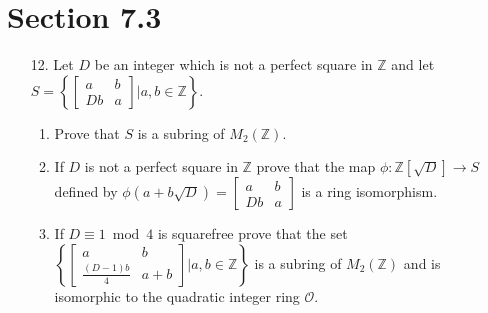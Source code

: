 \documentclass[12pt,leqno]{book}
\theoremstyle{definition}
\newcommand{\Z}{\mathbb{Z}}
\begin{document}
\section*{Section 7.3}
\begin{enumerate}
 \item [12.] Let $D$ be an integer which is not a perfect square in $\Z$ and let $S=\left\{\begin{bmatrix}a&b\\Db&a\end{bmatrix}|a,b\in\Z\right\}$.
  \begin{enumerate}
   \item Prove that $S$ is a subring of $M_2(\Z)$.
   \item If $D$ is not a perfect square in $\Z$ prove that the map $\phi:\Z[\sqrt{D}]\to S$ defined by $\phi(a+b\sqrt{D})=\begin{bmatrix}a&b\\Db&a\end{bmatrix}$ is a ring isomorphism.
   \item If $D\equiv1\bmod{4}$ is squarefree prove that the set $\left\{\begin{bmatrix}a&b\\\frac{(D-1)b}{4}&a+b\end{bmatrix}|a,b\in\Z\right\}$ is a subring of $M_2(\Z)$ and is isomorphic to the quadratic integer ring $\mathcal{O}$. 
  \end{enumerate}


\end{enumerate}
\end{document}
